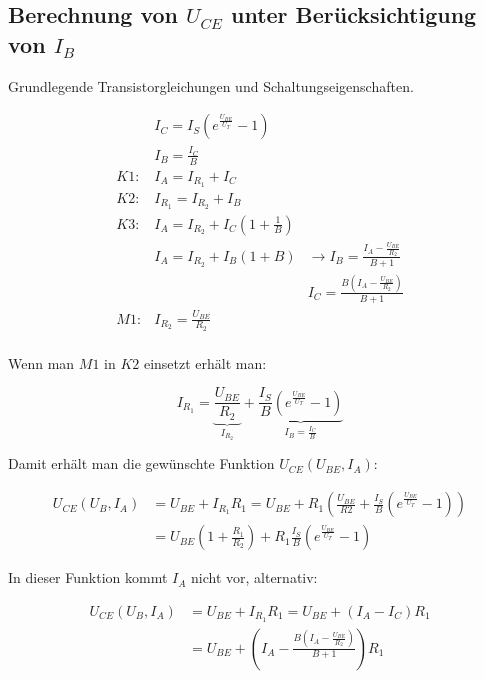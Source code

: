 \newpage
\subsection{Berechnung von $U_{CE}$ unter Berücksichtigung von $I_B$}

Grundlegende Transistorgleichungen und Schaltungseigenschaften. 

\begin{align*}
    {} & I_{C} = I_S \left( e^{\frac{U_{BE}}{U_T}} - 1\right) & {}\\
    {} & I_{B} = \frac{I_C}{B} & {}\\
    K1: & I_A = I_{R_{1}} + I_C & {}\\
    K2: & I_{R_{1}} = I_{R_{2}} + I_B & {}\\
    K3: & I_A = I_{R_2} + I_C \left( 1 + \frac{1}{B} \right) & {}\\
    {} & I_A = I_{R_2} + I_B \left( 1 + B \right) &\rightarrow  I_B = \frac{I_A - \frac{U_{BE}}{R_2}}{B+1} \\
    {} & {} &  I_C = \frac{B \left(I_A - \frac{U_{BE}}{R_2}\right)}{B+1} \\
    M1: & I_{R_{2}} = \frac{U_{BE}}{R_{2}} & {}\\
\end{align*}

Wenn man $M1$ in $K2$ einsetzt erhält man:

\begin{equation*}
    I_{R_1} = \underbrace{\frac{U_{BE}}{R_{2}}}_{I_{R_2}} + \underbrace{\frac{I_S}{B} \left( e^{\frac{U_{BE}}{U_T}} - 1\right)}_{I_B = \frac{I_C}{B}}
\end{equation*}

Damit erhält man die gewünschte Funktion $U_{CE}\left( U_{BE}, I_A \right)$:

\begin{align}
    U_{CE}\left( U_B, I_A \right) &= U_{BE} + I_{R_1} R_1 = U_{BE} + R_1 \left( \frac{U_{BE}}{R{2}} + \frac{I_S}{B} \left( e^{\frac{U_{BE}}{U_T}} - 1\right) \right) \\
    &= U_{BE} \left( 1 + \frac{R_1}{R_2 }\right) + R_1 \frac{I_S}{B} \left( e^{\frac{U_{BE}}{U_T}} - 1\right)
\end{align}

In dieser Funktion kommt $I_A$ nicht vor, alternativ:

\begin{align}
    U_{CE}\left( U_B, I_A \right) &= U_{BE} + I_{R_1} R_1 = U_{BE} + \left( I_A - I_C \right) R_1 \\
    &= U_{BE} + \left( I_A - \frac{B \left(I_A - \frac{U_{BE}}{R_2}\right)}{B+1} \right) R_1 \label{UCE_glg}
\end{align}

